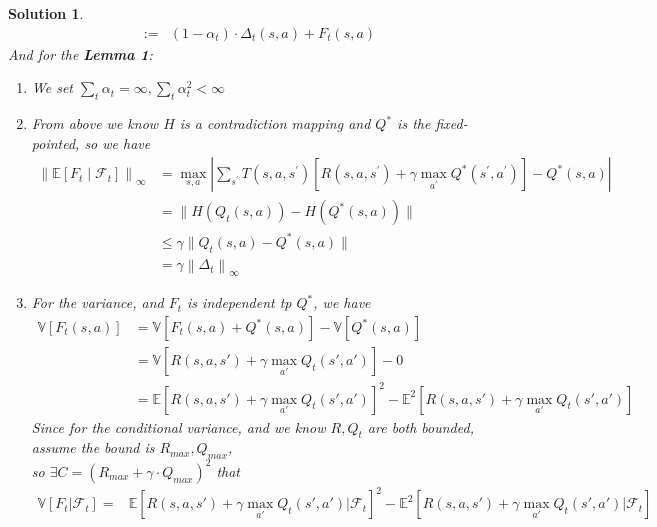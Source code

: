 \documentclass{article}
\newtheorem*{Solution}{Solution}
\begin{document}
\begin{enumerate}
\begin{enumerate}
\begin{Solution}
\begin{equation}
\begin{aligned}
        :=&(1-\alpha_t)\cdot\Delta_{t}(s,a)+F_t(s,a)
    \end{aligned}
    \end{equation}
    And for the \textbf{Lemma 1}:
    \begin{enumerate}
        \item We set $\sum_{t}\alpha_t=\infty,\sum_t\alpha_t^2<\infty$
        \item From above we know $H$ is a contradiction mapping and $Q^\ast$ is the fixed-pointed, so we have
        \begin{equation}
            \begin{aligned}
            \left\|\mathbb{E}\left[F_{t} \mid \mathcal{F}_{t}\right]\right\|_{\infty}&=\max_{s,a}|\sum_{s^{\prime}} T\left(s, a, s^{\prime}\right)\left[R\left(s, a, s^{\prime}\right)+\gamma \max _{a^{\prime}} Q^{*}\left(s^{\prime}, a^{\prime}\right)\right]-Q^\ast(s,a)|\\
            &=\|H(Q_t(s,a))-H(Q^\ast(s,a))\|\\
            &\leq \gamma\|Q_t(s,a)-Q^\ast(s,a)\|\\
            &= \gamma\left\|\Delta_{t}\right\|_{\infty}
            \end{aligned}
        \end{equation}
        \item For the variance, and $F_t$ is independent tp $Q^\ast$, we have
        \begin{equation}
            \begin{aligned}
            \mathbb{V}\left[F_t(s,a)\right]&=\mathbb{V}\left[F_t(s,a)+Q^\ast(s,a)\right]-\mathbb{V}\left[Q^\ast(s,a)\right]\\
            &=\mathbb{V}\left[R(s,a,s')+\gamma\max_{a'}Q_t(s',a')\right]-0\\
            &=\mathbb{E}\left[R(s,a,s')+\gamma\max_{a'}Q_t(s',a')\right]^2-\mathbb{E}^2\left[R(s,a,s')+\gamma\max_{a'}Q_t(s',a')\right]
            \end{aligned}
        \end{equation}
        Since for the conditional variance, and we know $R,Q_t$ are both bounded, assume the bound is $R_{max},Q_{max}$, \\so $\exists C=(R_{max}+\gamma\cdot Q_{max})^2$ that
        \begin{equation}
            \begin{aligned}
            \mathbb{V}\left[F_t|\mathcal{F}_{t}\right]=&\mathbb{E}\left[R(s,a,s')+\gamma\max_{a'}Q_t(s',a')|\mathcal{F}_{t}\right]^2-\mathbb{E}^2\left[R(s,a,s')+\gamma\max_{a'}Q_t(s',a')|\mathcal{F}_{t}\right]\\

\end{aligned}
\end{equation}
\end{enumerate}
\end{Solution}
\end{enumerate}
\end{enumerate}
\end{document}
